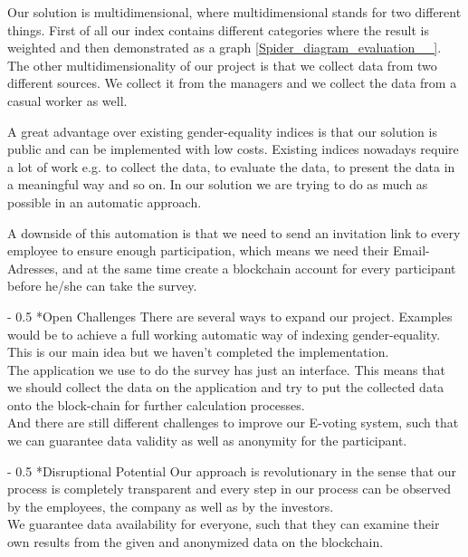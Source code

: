 \documentclass[portrait,a4paper]{article}
\makeatletter
\renewcommand\paragraph{\@startsection{paragraph}{4}{0mm}%
	{-\baselineskip}%
	{0.5\baselineskip}%
	{\normalfont\bfseries}%
}%
\makeatother
\begin{document}
		Our solution is multidimensional, where multidimensional stands for two different things. 
		First of all our index contains different categories where the result is weighted and then demonstrated 
		as a graph \ref{Spider_diagram_evaluation__}.
		The other multidimensionality of our project is that we collect data from two different sources. 
		We collect it from the managers and we collect the data from a casual worker as well.
		
		A great advantage over existing gender-equality indices is that our solution is public and can be implemented
		with low costs. Existing indices nowadays require a lot of work e.g. to collect the data, to evaluate the data, 
		to present the data in a meaningful way and so on. In our solution we are trying to do as much as possible in an automatic approach.
		
		A downside of this automation is that we need to send an invitation link to every employee to ensure enough participation, which means we need their Email-Adresses, and
		at the same time create a blockchain account for every participant before he/she can take the survey.

	\paragraph*{Open Challenges}
		There are several ways to expand our project. Examples would be to achieve a full working automatic way of 
		indexing gender-equality. This is our main idea but we haven't completed the implementation.\\
		The application we use to do the survey has just an interface. This means that we should collect the data on 
		the application and try to put the collected data onto the block-chain for further calculation processes.\\
		And there are still different challenges to improve our E-voting system, such that we can guarantee data validity
		as well as anonymity for the participant.
	
	\paragraph*{Disruptional Potential}
		Our approach is revolutionary in the sense that our process is completely transparent and every step in our process
		can be observed by the employees, the company as well as by the investors.\\
		We guarantee data availability for everyone, such that they can
		examine their own results from the given and anonymized data on the blockchain.\\
		
\end{document}
